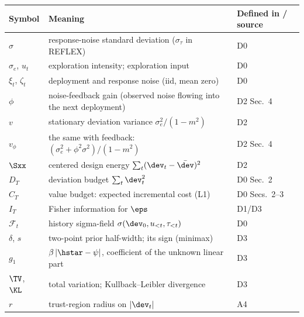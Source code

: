 \begin{center}\small
\begin{tabular}{@{}l>{\raggedright\arraybackslash}p{4.9cm}l@{}}
\hline
Symbol & Meaning & Defined in / source\\
\hline
$\sigma$ & response-noise standard deviation ($\sigma_\tau$ in
  REFLEX) & D0\\
$\sigma_e$, $u_t$ & exploration intensity; exploration input & D0\\
$\xi_t$, $\zeta_t$ & deployment and response noise (iid, mean
  zero) & D0\\
$\phi$ & noise-feedback gain (observed noise flowing into the
  next deployment) & D2 Sec.~4\\
$v$ & stationary deviation variance $\sigma_e^2/(1-m^2)$ & D2\\
$v_\phi$ & the same with feedback:
  $(\sigma_e^2 + \phi^2\sigma^2)/(1-m^2)$ & D2 Sec.~4\\
$\Sxx$ & centered design energy
  $\sum_t (\dev_t - \bar{\dev})^2$ & D2\\
$D_T$ & deviation budget $\sum_t \dev_t^2$ & D0 Sec.~2\\
$C_T$ & value budget: expected incremental cost (L1)
  & D0 Secs.~2--3\\
$I_T$ & Fisher information for $\eps$ & D1/D3\\
$\mathcal{F}_t$ & history sigma-field
  $\sigma(\dev_0, u_{<t}, \tau_{<t})$ & D0\\
$\delta$, $s$ & two-point prior half-width; its sign (minimax)
  & D3\\
$g_1$ & $\beta\,\lvert \hstar - \psi \rvert$, coefficient of the
  unknown linear part & D3\\
$\TV$, $\KL$ & total variation; Kullback--Leibler divergence & D3\\
$r$ & trust-region radius on $\lvert \dev_t \rvert$ & A4\\
\hline
\end{tabular}
\end{center}

